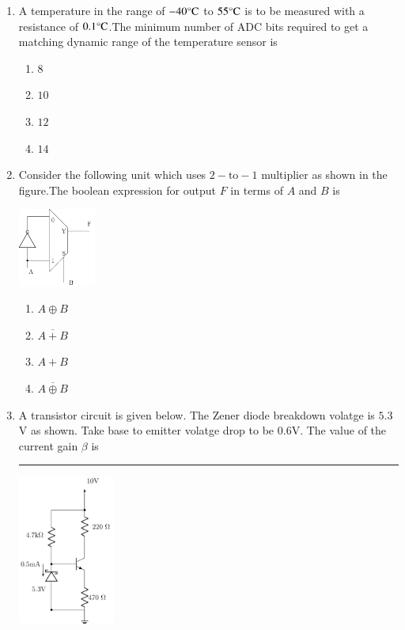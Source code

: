 \documentclass[journal,12pt,onecolumn]{IEEEtran}
\theoremstyle{remark}
\begin{document}
\begin{enumerate}
\begin{multicols}{4}
   \end{multicols}
   \item A temperature in the range of $-40\degree\text{C}$ to $55\degree\text{C}$ is to
   be measured with a resistance of $0.1\degree\text{C}$.The minimum number of ADC bits required to get a matching dynamic range of the temperature sensor is
   \begin{multicols}{4}
       \begin{enumerate}
           \item $8$
           \item $10$
           \item $12$
           \item $14$
       \end{enumerate}
   \end{multicols}
   \item Consider the following unit which uses $2-\text{to}-1$ multiplier as shown in the figure.The boolean expression for output $F$ in terms of $A$ and $B$ is
 \begin{center}

\includegraphics[width=0.2\textwidth]{figs/fig1/main} 
\end{center}
 
	   
   \begin{multicols}{4}
       \begin{enumerate}
           \item $A \oplus B$ \item $\overline{A+B}$ \item $A+B$ \item $\overline{A \oplus B}$
       \end{enumerate}
   \end{multicols}
   \item A transistor circuit is given below. The Zener diode breakdown volatge is $5.3$ V as shown. Take base to emitter volatge drop to be $0.6$V. The value of the current gain $\beta$ is \rule{3cm}{0.15mm}
 \begin{center}

\includegraphics[width=0.25\textwidth]{figs/fig2/main} 
\end{center}
	   

\end{enumerate}
\end{document}
